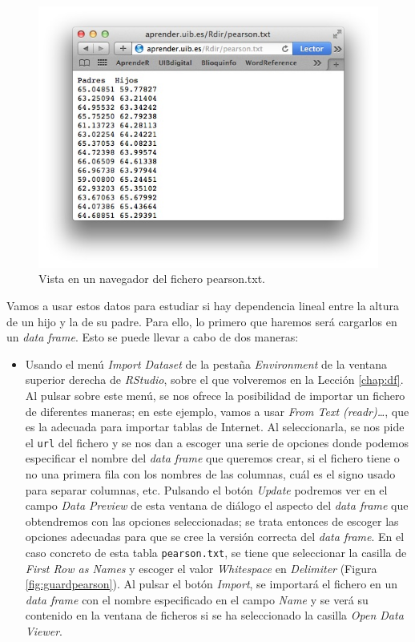 \documentclass[
]{book}
\providecommand{\tightlist}{%
  \setlength{\itemsep}{0pt}\setlength{\parskip}{0pt}}
\theoremstyle{definition}
\theoremstyle{definition}
\theoremstyle{definition}
\theoremstyle{remark}
\begin{document}
\begin{figure}

{\centering \includegraphics[width=0.9\linewidth]{AprendeR-Parte-I_files/figure-html/pearson} 

}

\caption{Vista en un navegador del fichero pearson.txt.}\label{fig:pearson}
\end{figure}

Vamos a usar estos datos para estudiar si hay dependencia lineal entre la altura de un hijo y la de su padre. Para ello, lo primero que haremos será cargarlos en un \emph{data frame}. Esto se puede llevar a cabo de dos maneras:

\begin{itemize}
\tightlist
\item
  Usando el menú \emph{Import Dataset} \label{page:import} de la pestaña \emph{Environment} de la ventana superior derecha de \emph{RStudio}, sobre el que volveremos en la Lección \ref{chap:df}. Al pulsar sobre este menú, se nos ofrece la posibilidad de importar un fichero de diferentes maneras; en este ejemplo, vamos a usar \emph{From Text (readr)\ldots{}}, que es la adecuada para importar tablas de Internet. Al seleccionarla, se nos pide el \texttt{url} del fichero y se nos dan a escoger una serie de opciones donde podemos especificar el nombre del \emph{data frame} que queremos crear, si el fichero tiene o no una primera fila con los nombres de las columnas, cuál es el signo usado para separar columnas, etc. Pulsando el botón \emph{Update} podremos ver en el campo \emph{Data Preview} de esta ventana de diálogo el aspecto del \emph{data frame} que obtendremos con las opciones seleccionadas; se trata entonces de escoger las opciones adecuadas para que se cree la versión correcta del \emph{data frame}.
  En el caso concreto de esta tabla \texttt{pearson.txt}, se tiene que seleccionar la casilla de \emph{First Row as Names} y escoger el valor \emph{Whitespace} en \emph{Delimiter} (Figura \ref{fig:guardpearson}). Al pulsar el botón \emph{Import}, se importará el fichero en un \emph{data frame} con el nombre especificado en el campo \emph{Name} y se verá su contenido en la ventana de ficheros si se ha seleccionado la casilla \emph{Open Data Viewer}.
\end{itemize}
\end{document}
